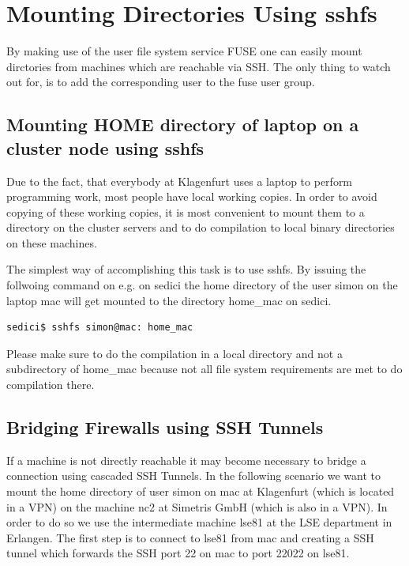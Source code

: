 \chapter{Mounting Directories Using sshfs}
\label{chap:mounting_sshfs}

By  making use  of the  user file  system service  FUSE one  can  easily mount
dirctories from machines which are reachable  via SSH. The only thing to watch
out for, is to add the corresponding user to the fuse user group.

\section{Mounting HOME directory of laptop on a cluster node using sshfs}

Due  to the  fact,  that everybody  at  Klagenfurt uses  a  laptop to  perform
programming work,  most people  have local working  copies. In order  to avoid
copying of  these working  copies, it is  most convenient  to mount them  to a
directory  on  the cluster  servers  and to  do  compilation  to local  binary
directories on these machines.

The simplest  way of accomplishing this task  is to use sshfs.  By issuing the
follwoing command  on e.g. on sedici the  home directory of the  user simon on
the laptop mac will get mounted to the directory home\_mac on sedici.

\begin{verbatim}
sedici$ sshfs simon@mac: home_mac
\end{verbatim}

Please  make sure  to  do  the compilation  in  a local  directory  and not  a
subdirectory of home\_mac because not  all file system requirements are met to
do compilation there.

\section{Bridging Firewalls using SSH Tunnels}

If a  machine is not  directly reachable it  may become necessary to  bridge a
connection using  cascaded SSH Tunnels. In  the following scenario  we want to
mount the home directory of user  simon on mac at Klagenfurt (which is located
in a  VPN) on the machine  nc2 at Simetris GmbH  (which is also in  a VPN). In
order to do so we use the  intermediate machine lse81 at the LSE department in
Erlangen. The first  step is to connect  to lse81 from mac and  creating a SSH
tunnel which forwards the SSH port 22 on mac to port 22022 on lse81.

